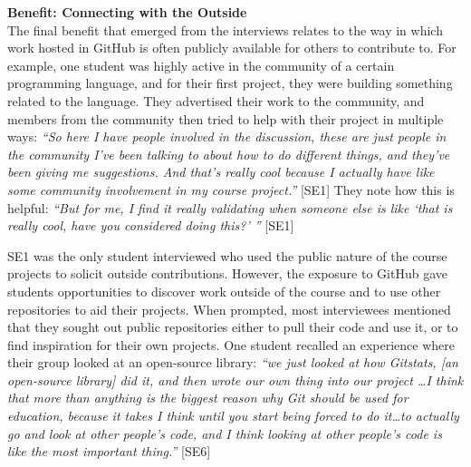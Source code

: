 

\textbf{Benefit: Connecting with the Outside} \\
The final benefit that emerged from the interviews relates to the way in which work hosted in GitHub is often publicly available for others to contribute to. For example, one student was highly active in the community of a certain programming language, and for their first project, they were building something related to the language. They advertised their work to the community, and members from the community then tried to help with their project in multiple ways: \textit{``So here I have people involved in the discussion, these are just people in the community I've been talking to about how to do different things, and they've been giving me suggestions. And that's really cool because I actually have like some community involvement in my course project.''} [SE1] They note how this is helpful: \textit{``But for me, I find it really validating when someone else is like `that is really cool, have you considered doing this?' ''} [SE1]

SE1 was the only student interviewed who used the public nature of the course projects to solicit outside contributions. However, the exposure to GitHub gave students opportunities to discover work outside of the course and to use other repositories to aid their projects. When prompted, most interviewees mentioned that they sought out public repositories either to pull their code and use it, or to find inspiration for their own projects. One student recalled an experience where their group looked at an open-source library: \textit{``we just looked at how Gitstats, [an open-source library] did it, and then wrote our own thing into our project \ldots I think that more than anything is the biggest reason why Git should be used for education, because it takes I think until you start being forced to do it\ldots to actually go and look at other people's code, and I think looking at other people's code is like the most important thing.''} [SE6]

